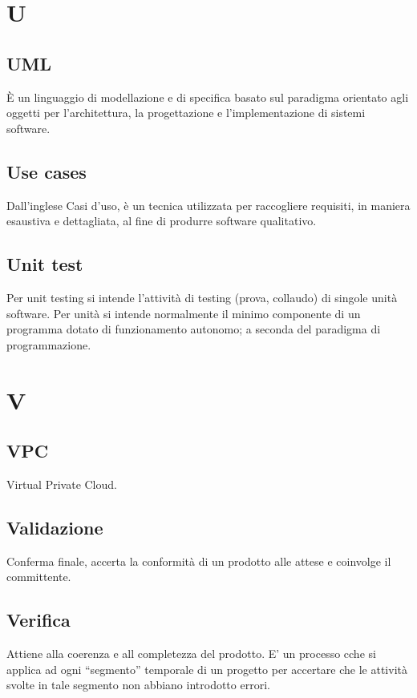 \documentclass{classes/base}
\begin{document}
        \newpage  
    \section{U}
        \subsection*{UML}
		     È un linguaggio di modellazione e di specifica basato sul paradigma orientato agli oggetti per l'architettura, la progettazione e l'implementazione di sistemi software.

        \subsection*{Use cases} 
        Dall'inglese Casi d'uso, è un tecnica utilizzata per raccogliere requisiti, in maniera esaustiva e dettagliata, al fine di produrre software qualitativo.

        \subsection*{Unit test}
        Per unit testing si intende l'attività di testing (prova, collaudo) di singole unità software. 
        Per unità si intende normalmente il minimo componente di un programma dotato di funzionamento autonomo; a seconda del paradigma di programmazione.
        
        \newpage  
    \section{V}

        \subsection*{VPC}
        Virtual Private Cloud.

        \subsection*{Validazione} 
        Conferma finale, accerta la conformità di un prodotto alle attese e coinvolge il committente.

        \subsection*{Verifica}
        Attiene alla coerenza e all completezza del prodotto. E’ un processo cche si applica ad ogni “segmento” temporale di un progetto per accertare che le attività svolte in tale segmento non abbiano introdotto errori.
\end{document}
